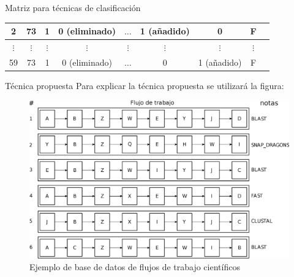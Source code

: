 \begin{frame}
\begin{block}{Matriz para técnicas de clasificación}
\begin{table}[!htb]
\begin{tabular}{|c|c|c|c|c|c|c|c|c|}
				2	&		73 					   & 1 			  & 0 (eliminado)  & \(\ldots\)& 1 (añadido) & 0  & F	\\ \hline
				\(\vdots\)  &		\(\vdots\) 	   & \(\vdots\)   & \(\vdots\) 	  & \(\vdots\) 	  & \(\vdots\) & \(\vdots\) & \(\vdots\)	\\ \hline
				59	&		73 					   & 1 			  & 0 (eliminado)  & \(\ldots\) 	  & 0 & 1 (añadido) & F	\\ \hline
			\end{tabular}
			\label{tabela_matriz_de_dados_adapatada_classificacao_regressao}
		\end{table}
	\end{block}
\end{frame}


\begin{frame}		
	\begin{block}{Técnica propuesta}
		Para explicar la técnica propuesta se utilizará la figura:
				\begin{figure}
					\begin{minipage}[b]{0.8\textwidth}
						\includegraphics[width=\textwidth]{./secoes/SolucaoProposta/recomendacaofreqontologia.eps}
						\caption{Ejemplo de base de datos de flujos de trabajo científicos}
					\end{minipage}
				\end{figure}
	\end{block}
\end{frame}


